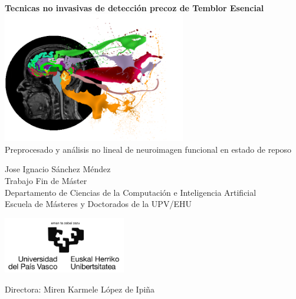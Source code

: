 
\thispagestyle{empty}

\begin{titlepage}

    \begin{center}

		\Huge
		\textbf{Tecnicas no invasivas de detección precoz de Temblor Esencial}
		\vspace{0.5cm}
		\\
		\includegraphics[width=0.6\textwidth]{img/front}
		\\
		\LARGE
		Preprocesado y análisis no lineal de neuroimagen funcional en estado de reposo 
		
		\vspace{1.5cm}
		
		\small{Jose Ignacio Sánchez Méndez}\\

		Trabajo Fin de Máster\\
		Departamento de Ciencias de la Computación e Inteligencia Artificial\\
		Escuela de Másteres y Doctorados de la UPV/EHU
		
		\includegraphics[width=0.4\textwidth]{img/universidad}
		
		
	\end{center}
	
\vfill
\small
\noindent Directora: Miren Karmele López de Ipiña
\end{titlepage}
